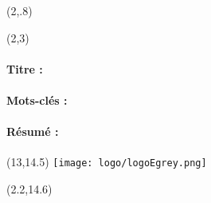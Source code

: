 \begin{textblock}{10}(2,.8)
\logoED
\end{textblock}


\begin{textblock}{13}(2,3)
\paragraph{Titre :} \textbf{\PhDTitleFR} 
\paragraph{Mots-cl\'es :} \PhDkeywordsFR  \bigskip

\paragraph{R\'esum\'e :} \PhDsumFR 
\end{textblock}


\begin{textblock}{13}(13,14.5)
\texttt{[image: logo/logoEgrey.png]}
\end{textblock}
\parindent=0pt 



\begin{textblock}{10}(2.2,14.6)

\end{textblock}
